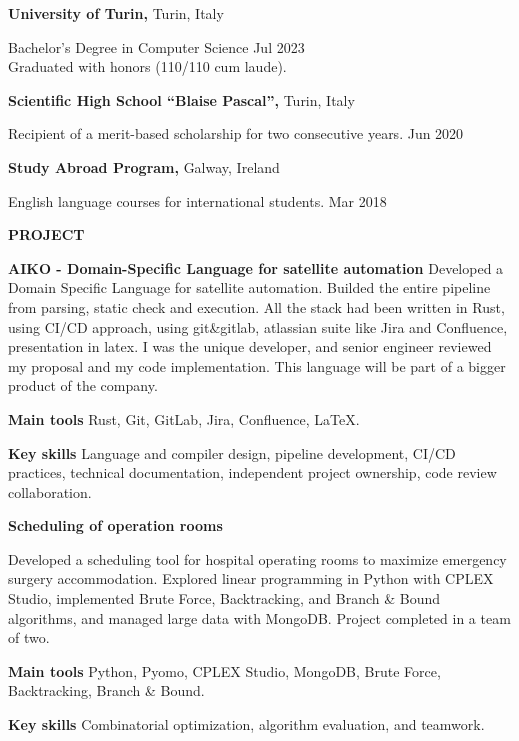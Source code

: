 \documentclass[11pt]{article}
\begin{document}
\vspace{8pt}

\textbf{University of Turin,} Turin, Italy

Bachelor’s Degree in Computer Science \hfill Jul 2023 \\
Graduated with honors (110/110 cum laude).

\vspace{8pt}

\textbf{Scientific High School “Blaise Pascal”,} Turin, Italy

Recipient of a merit-based scholarship for two consecutive years. \hfill Jun 2020

\vspace{8pt}

\textbf{Study Abroad Program,} Galway, Ireland

English language courses for international students. \hfill Mar 2018

\vspace{8mm}

\textbf{PROJECT}

\textbf{AIKO - Domain-Specific Language for satellite automation}
Developed a Domain Specific Language for satellite automation. Builded the entire pipeline from parsing, static check and execution. All the stack had been written in Rust, using CI/CD approach, using git\&gitlab, atlassian suite like Jira and Confluence, presentation in latex. I was the unique developer, and senior engineer reviewed my proposal and my code implementation. This language will be part of a bigger product of the company. 

\textbf{Main tools}
Rust, Git, GitLab, Jira, Confluence, LaTeX.

\textbf{Key skills}
Language and compiler design, pipeline development, CI/CD practices, technical documentation, independent project ownership, code review collaboration.

\textbf{Scheduling of operation rooms}

Developed a scheduling tool for hospital operating rooms to maximize emergency surgery accommodation. Explored linear programming in Python with CPLEX Studio, implemented Brute Force, Backtracking, and Branch \& Bound algorithms, and managed large data with MongoDB. Project completed in a team of two.

\textbf{Main tools}
Python, Pyomo, CPLEX Studio, MongoDB, Brute Force, Backtracking, Branch \& Bound. 
 
\textbf{Key skills}
Combinatorial optimization, algorithm evaluation, and teamwork.
\end{document}
